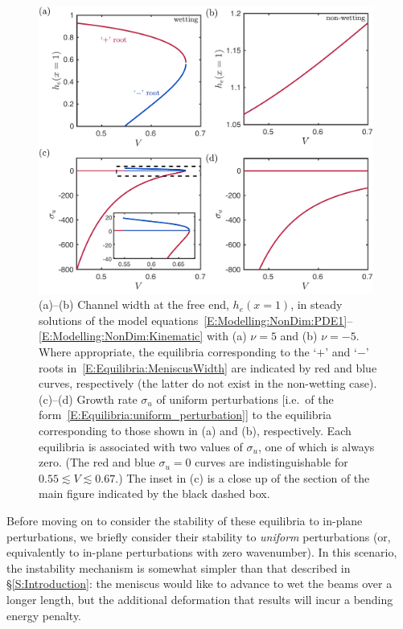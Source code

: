\documentclass{jfm}
\begin{document}
\begin{figure}
\centering
\includegraphics[width =0.98\textwidth]{figures/fig5_equilibria.pdf}
\caption{(a)--(b) Channel width at the free end, $h_e(x = 1)$, in steady solutions of the model equations~\eqref{E:Modelling:NonDim:PDE1}--\eqref{E:Modelling:NonDim:Kinematic} with (a) $\nu = 5$ and (b) $\nu = -5$. Where appropriate, the equilibria corresponding to the `$+$' and `$-$' roots in~\eqref{E:Equilibria:MeniscusWidth} are indicated by red and blue curves, respectively (the latter do not exist in the non-wetting case). (c)--(d) Growth rate $\sigma_u$ of uniform perturbations [i.e.~of the form~\eqref{E:Equilibria:uniform_perturbation}] to the equilibria corresponding to those shown in (a) and (b), respectively. Each equilibria is associated with two values of $\sigma_u$, one of which is always zero. (The red and blue $\sigma_u = 0$ curves are indistinguishable for $0.55 \lesssim V \lesssim 0.67$.) The inset in (c) is a close up of the section of the main figure indicated by the black dashed box.}\label{fig:Equilibria}
\end{figure}

Before moving on to consider the stability of these equilibria to in-plane perturbations, we briefly consider their stability to \textit{uniform} perturbations (or, equivalently to in-plane perturbations with zero wavenumber). In this scenario, the instability mechanism is somewhat simpler than that described in \S\ref{S:Introduction}: the meniscus would like to advance to wet the beams over a longer length, but the additional deformation that results will incur a bending energy penalty.
\end{document}
